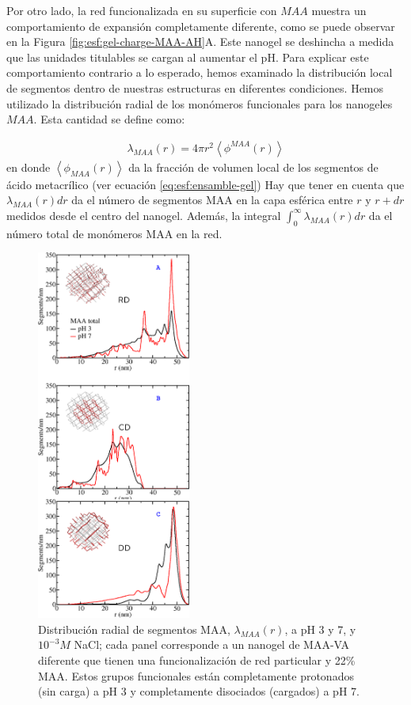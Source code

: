 Por otro lado, la red funcionalizada en su superficie con $MAA$ muestra un comportamiento de expansi\'on completamente diferente, como se puede observar en la Figura \ref{fig:esf:gel-charge-MAA-AH}A. Este nanogel se deshincha a medida que las unidades titulables se cargan al aumentar el pH. Para explicar este comportamiento contrario a lo esperado, hemos examinado la distribuci\'on local de segmentos dentro de nuestras estructuras en diferentes condiciones. Hemos utilizado la distribuci\'on radial de los mon\'omeros funcionales para los nanogeles $MAA$. Esta cantidad se define como:



%
\begin{align}
    \lambda_{MAA}(r)= 4\pi r^2\left<\phi^{MAA}(r)\right>
\end{align}
%
\noindent en donde $\left<\phi_{MAA}(r)\right>$ da la fracci\'on de volumen local de los segmentos de \'acido metacr\'ilico (ver ecuaci\'on \ref{eq:esf:ensamble-gel})
Hay que tener en cuenta que $\lambda_{MAA}(r) dr$ da el n\'umero de segmentos MAA en la capa esf\'erica entre $r$ y $r+dr$ medidos desde el centro del nanogel.
Adem\'as, la integral $\int_0^\infty \lambda_{MAA}(r) dr$ da el n\'umero total de mon\'omeros MAA en la red.


\begin{figure}[!htb]
     \centering
     \includegraphics[width=0.45\textwidth]{Figures/graphs-gel2/dist-MAA.png}
     \caption{Distribuci\'on radial de segmentos MAA, $\lambda_{MAA}(r)$, a pH 3 y 7, y $10^{-3}M$ NaCl; cada panel corresponde a un nanogel de  MAA-VA diferente que tienen una funcionalizaci\'on de red particular y 22\% MAA.
     	Estos grupos funcionales est\'an completamente protonados (sin carga) a pH 3 y completamente disociados (cargados) a pH 7.}
     \label{fig:esf:MAA-vs-r-distribution}
 \end{figure}

